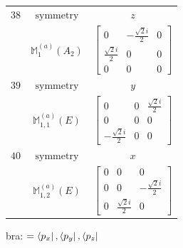 \documentclass[fleqn,8pt,landscape]{jsarticle}
\begin{document}
\begin{longtable}{ccc}
$ 38 $ & $ \text{symmetry} $ & $ z $ \\
$  $ & $ \mathbb{M}_{1}^{(a)}(A_{2}) $ & $ \begin{bmatrix} 0 & - \frac{\sqrt{2} i}{2} & 0 \\ \frac{\sqrt{2} i}{2} & 0 & 0 \\ 0 & 0 & 0 \end{bmatrix} $ \\ \hline
$ 39 $ & $ \text{symmetry} $ & $ y $ \\
$  $ & $ \mathbb{M}_{1,1}^{(a)}(E) $ & $ \begin{bmatrix} 0 & 0 & \frac{\sqrt{2} i}{2} \\ 0 & 0 & 0 \\ - \frac{\sqrt{2} i}{2} & 0 & 0 \end{bmatrix} $ \\ \hline
$ 40 $ & $ \text{symmetry} $ & $ x $ \\
$  $ & $ \mathbb{M}_{1,2}^{(a)}(E) $ & $ \begin{bmatrix} 0 & 0 & 0 \\ 0 & 0 & - \frac{\sqrt{2} i}{2} \\ 0 & \frac{\sqrt{2} i}{2} & 0 \end{bmatrix} $ \\ \hline
\end{longtable}
bra: $=\bra{p_{x}}, \bra{p_{y}}, \bra{p_{z}}$
\end{document}

